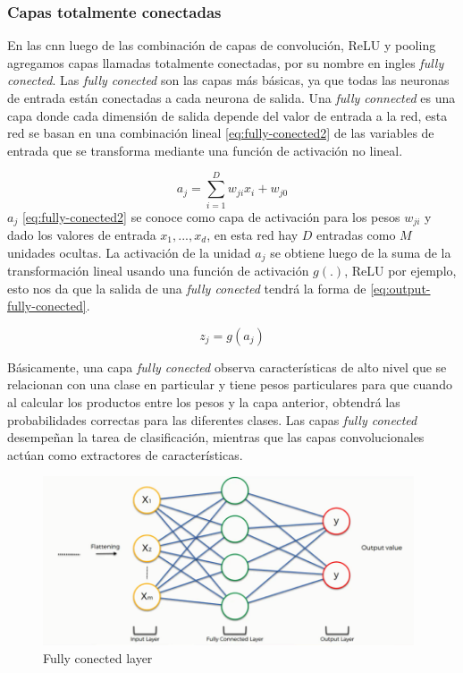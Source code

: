 \subsubsection{Capas totalmente conectadas}\label{sub:fully_connected}

En las \ac{cnn} luego de las combinación de capas de convolución, ReLU y pooling agregamos capas llamadas totalmente conectadas, por su nombre en ingles \textit{fully conected}.
Las \textit{fully conected} son las capas más básicas, ya que todas las neuronas de entrada están conectadas a cada neurona de salida. Una \textit{fully connected }  es una capa donde cada dimensión de salida  depende del valor de entrada a la red, esta red se basan en una combinación lineal \ref{eq:fully-conected2} de las variables de entrada que se transforma mediante una función de activación no lineal.


\begin{equation}\label{eq:fully-conected2}
a_j = \sum_{i=1}^D w_{ji}  x_i + w_{j0}
\end{equation}
$ a_j$ \ref{eq:fully-conected2}  se conoce como capa de activación para los pesos $w_{ji}$ y dado los valores de entrada ${x_1,...,x_d}$, en esta red hay  $ D$ entradas como $M$ unidades ocultas. La activación de la unidad  $ a_j$ se obtiene luego de la suma de la transformación lineal usando una función de activación $ g(.)$, ReLU por ejemplo, esto nos da que la salida de una \textit{fully conected} tendrá la forma de  \ref{eq:output-fully-conected}.

\begin{equation}\label{eq:output-fully-conected}
z_j = g(a_j)
\end{equation}

Básicamente, una capa \textit{fully conected} observa características de alto nivel que se relacionan con una clase en particular y tiene pesos particulares para que cuando al calcular los productos entre los pesos y la capa anterior, obtendrá las probabilidades correctas para las diferentes clases. Las capas \textit{fully conected }desempeñan  la tarea de clasificación, mientras que las capas convolucionales actúan como extractores de características.

\begin{figure}[H]
 \centering
  \includegraphics[height=5cm,keepaspectratio=true,clip=true]{imagenes/MarcoTeorico/fully_conected.png}
  \caption{Fully conected layer} \label{Fig:fully_conected}
\end{figure}


